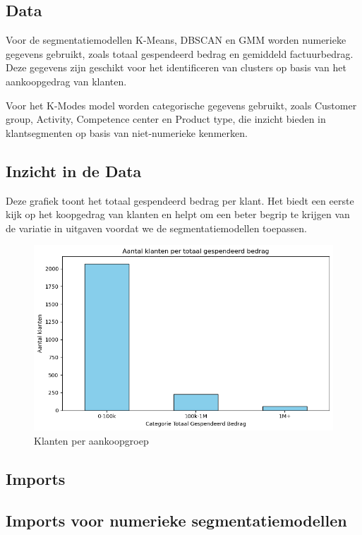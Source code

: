 \subsection{Data}

Voor de segmentatiemodellen K-Means, DBSCAN en GMM worden numerieke gegevens gebruikt, zoals totaal gespendeerd bedrag en gemiddeld factuurbedrag. Deze gegevens zijn geschikt voor het identificeren van clusters op basis van het aankoopgedrag van klanten.

\vspace{1em} 

Voor het K-Modes model worden categorische gegevens gebruikt, zoals Customer group, Activity, Competence center en Product type, die inzicht bieden in klantsegmenten op basis van niet-numerieke kenmerken.

\subsection*{Inzicht in de Data}

Deze grafiek toont het totaal gespendeerd bedrag per klant. Het biedt een eerste kijk op het koopgedrag van klanten en helpt om een beter begrip te krijgen van de variatie in uitgaven voordat we de segmentatiemodellen toepassen.

\begin{figure}[H]
    \centering
    \includegraphics[width=0.8\linewidth]{images/Kmeans/KlantenAnalyse}
    \caption{Klanten per aankoopgroep}
    \label{fig:KlantenPerGroep}
\end{figure}



\subsection{Imports}

\subsection*{Imports voor numerieke segmentatiemodellen}

